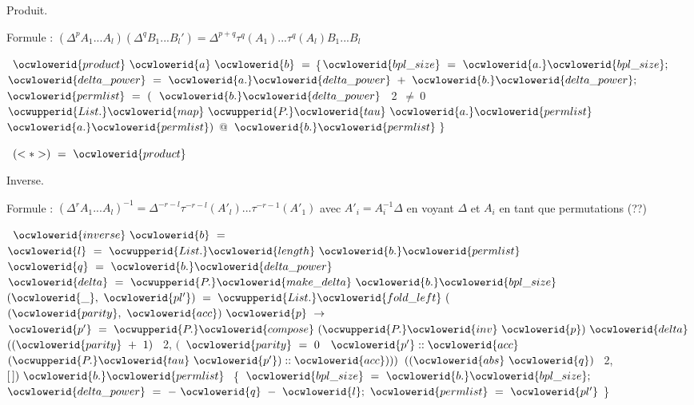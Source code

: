 \documentclass[12pt]{article}
\begin{document}
\ocweol
\ocwindent{0.00em}
Produit.

   Formule : $(\Delta^p A_1...A_l)(\Delta^q B_1...B_l') =
               \Delta^{p+q} \tau^q(A_1)...\tau^q(A_l) B_1...B_l$

\ocweol
\label{Canonical.ml:5673}%
\medskip
\ocwbegincode{}\ocwindent{0.00em}
~$\ocwlowerid{product}~\ocwlowerid{a}~\ocwlowerid{b}~=$\ocweol
\ocwindent{1.00em}
\{$\ocwlowerid{bpl\_size}~=~\ocwlowerid{a.}\ocwlowerid{bpl\_size};$\ocweol
\ocwindent{1.50em}
$\ocwlowerid{delta\_power}~=~\ocwlowerid{a.}\ocwlowerid{delta\_power}~+~\ocwlowerid{b.}\ocwlowerid{delta\_power};$\ocweol
\ocwindent{1.50em}
$\ocwlowerid{permlist}~=~($~$\ocwlowerid{b.}\ocwlowerid{delta\_power}~$~2~$\not=~0~$~$\ocwupperid{List.}\ocwlowerid{map}~\ocwupperid{P.}\ocwlowerid{tau}~\ocwlowerid{a.}\ocwlowerid{permlist}~$~$\ocwlowerid{a.}\ocwlowerid{permlist})$\ocweol
\ocwindent{7.00em}
@~$\ocwlowerid{b.}\ocwlowerid{permlist}~\}$\medskip

\label{Canonical.ml:5888}%
\ocwindent{0.00em}
~$(\ensuremath{<}*\ensuremath{>})~=~\ocwlowerid{product}$\medskip

\ocwendcode{}\ocwindent{0.00em}
Inverse.

   Formule : $(\Delta^r A_1...A_l)^{-1} =
               \Delta^{-r-l} \tau^{-r-l}(A'_l)...\tau^{-r-1}(A'_1)$
   avec $A'_i = A_i^{-1} \Delta$ en voyant $\Delta$ et $A_i$ en tant que permutations (??)

\ocweol
\label{Canonical.ml:6133}%
\medskip
\ocwbegincode{}\ocwindent{0.00em}
~$\ocwlowerid{inverse}~\ocwlowerid{b}~=$\ocweol
\ocwindent{1.00em}
~$\ocwlowerid{l}~=~\ocwupperid{List.}\ocwlowerid{length}~\ocwlowerid{b.}\ocwlowerid{permlist}~$~$\ocwlowerid{q}~=~\ocwlowerid{b.}\ocwlowerid{delta\_power}~$\ocweol
\ocwindent{1.00em}
~$\ocwlowerid{delta}~=~\ocwupperid{P.}\ocwlowerid{make\_delta}~\ocwlowerid{b.}\ocwlowerid{bpl\_size}~$\ocweol
\ocwindent{1.00em}
~$(\ocwlowerid{\_},~\ocwlowerid{pl'})~=$\ocweol
\ocwindent{2.00em}
$\ocwupperid{List.}\ocwlowerid{fold\_left}~($~$(\ocwlowerid{parity},~\ocwlowerid{acc})~\ocwlowerid{p}~\rightarrow{}$\ocweol
\ocwindent{11.00em}
~$\ocwlowerid{p'}~=~\ocwupperid{P.}\ocwlowerid{compose}~(\ocwupperid{P.}\ocwlowerid{inv}~\ocwlowerid{p})~\ocwlowerid{delta}~$\ocweol
\ocwindent{11.00em}
$((\ocwlowerid{parity}~+~1)~$~2,\ocweol
\ocwindent{11.50em}
$($~$\ocwlowerid{parity}~=~0~$~$\ocwlowerid{p'}::\ocwlowerid{acc}~$~$(\ocwupperid{P.}\ocwlowerid{tau}~\ocwlowerid{p'})::\ocwlowerid{acc})))$\ocweol
\ocwindent{9.50em}
$((\ocwlowerid{abs}~\ocwlowerid{q})~$~2,~$[\,])~\ocwlowerid{b.}\ocwlowerid{permlist}~$\ocweol
\ocwindent{1.00em}
\{~$\ocwlowerid{bpl\_size}~=~\ocwlowerid{b.}\ocwlowerid{bpl\_size};$\ocweol
\ocwindent{2.00em}
$\ocwlowerid{delta\_power}~=~-~\ocwlowerid{q}~-~\ocwlowerid{l};$\ocweol
\ocwindent{2.00em}
$\ocwlowerid{permlist}~=~\ocwlowerid{pl'}$\ocweol
\ocwindent{1.00em}
\}\medskip
\end{document}
